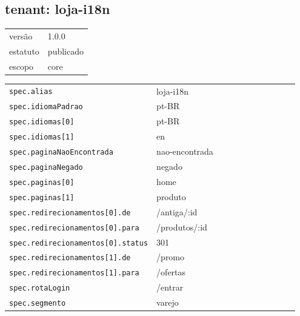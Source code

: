 \subsection*{tenant: loja-i18n}
\begin{tabular}{@{}ll@{}}
versão & 1.0.0 \\
estatuto & publicado \\
escopo & core \\
\end{tabular}

\begin{tabular}{@{}p{0.35\linewidth}p{0.6\linewidth}@{}}
\texttt{spec.alias} & loja-i18n \\
\texttt{spec.idiomaPadrao} & pt-BR \\
\texttt{spec.idiomas[0]} & pt-BR \\
\texttt{spec.idiomas[1]} & en \\
\texttt{spec.paginaNaoEncontrada} & nao-encontrada \\
\texttt{spec.paginaNegado} & negado \\
\texttt{spec.paginas[0]} & home \\
\texttt{spec.paginas[1]} & produto \\
\texttt{spec.redirecionamentos[0].de} & /antiga/:id \\
\texttt{spec.redirecionamentos[0].para} & /produtos/:id \\
\texttt{spec.redirecionamentos[0].status} & 301 \\
\texttt{spec.redirecionamentos[1].de} & /promo \\
\texttt{spec.redirecionamentos[1].para} & /ofertas \\
\texttt{spec.rotaLogin} & /entrar \\
\texttt{spec.segmento} & varejo \\
\end{tabular}
